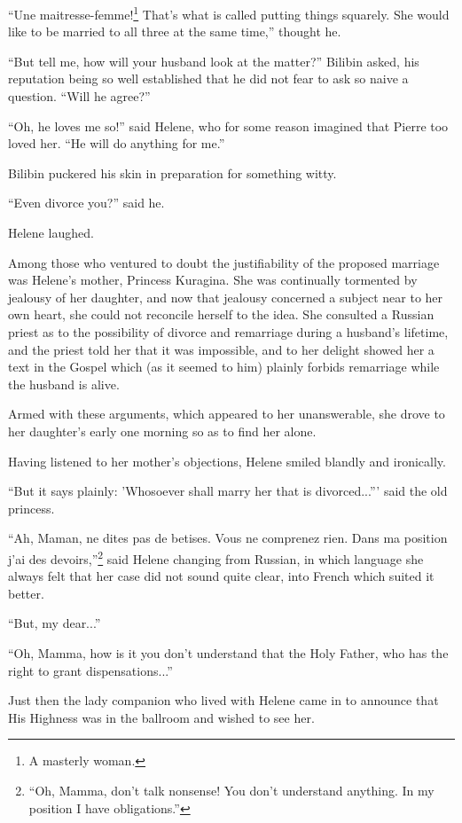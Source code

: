 ``Une maitresse-femme!\footnote{A masterly woman.} That's what is
called putting things squarely.  She would like to be married to
all three at the same time,'' thought he.

``But tell me, how will your husband look at the matter?''
Bilibin asked, his reputation being so well established that he
did not fear to ask so naive a question. ``Will he agree?''

``Oh, he loves me so!'' said Helene, who for some reason imagined
that Pierre too loved her. ``He will do anything for me.''

Bilibin puckered his skin in preparation for something witty.

``Even divorce you?'' said he.

Helene laughed.

Among those who ventured to doubt the justifiability of the
proposed marriage was Helene's mother, Princess Kuragina. She was
continually tormented by jealousy of her daughter, and now that
jealousy concerned a subject near to her own heart, she could not
reconcile herself to the idea. She consulted a Russian priest as
to the possibility of divorce and remarriage during a husband's
lifetime, and the priest told her that it was impossible, and to
her delight showed her a text in the Gospel which (as it seemed
to him) plainly forbids remarriage while the husband is alive.

Armed with these arguments, which appeared to her unanswerable,
she drove to her daughter's early one morning so as to find her
alone.

Having listened to her mother's objections, Helene smiled blandly
and ironically.

``But it says plainly: 'Whosoever shall marry her that is
divorced...'''  said the old princess.

``Ah, Maman, ne dites pas de betises. Vous ne comprenez
rien. Dans ma position j'ai des devoirs,''\footnote{``Oh, Mamma,
don't talk nonsense!  You don't understand anything. In my
position I have obligations.''} said Helene changing from
Russian, in which language she always felt that her case did not
sound quite clear, into French which suited it better.

``But, my dear...''

``Oh, Mamma, how is it you don't understand that the Holy Father,
who has the right to grant dispensations...''

Just then the lady companion who lived with Helene came in to
announce that His Highness was in the ballroom and wished to see
her.

